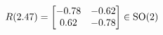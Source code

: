 \documentclass[preview]{standalone}
\begin{document}
\begin{align*}
\special{dvisvgm:raw <g id='unique000'>}R(2.47) = \begin{bmatrix} -0.78 & -0.62 \\ 0.62 & -0.78 \end{bmatrix} \in \text{SO}(2)\special{dvisvgm:raw </g>}
\end{align*}
\end{document}

